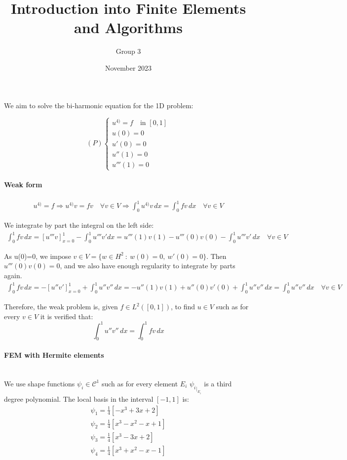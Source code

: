 \documentclass{article}
\title{Introduction into Finite Elements and Algorithms}
\author{Group 3}
\date{November 2023}
\begin{document}
\maketitle

\noindent We aim to solve the bi-harmonic equation for the 1D problem:

\[ (P) \left\{
\begin{array}{rcl}
u^{4)}=f \quad \text{in } [0,1]\\
u(0)=0\\
u'(0)=0\\
u''(1)=0\\
u'''(1)=0
\end{array}
\right.\]

\paragraph{Weak form}
\begin{gather*}
    u^{4)}=f \Rightarrow u^{4)}v=fv \quad\forall v\in V \Rightarrow \int_0^1 u^{4)}v \,dx= \int_0^1 fv \,dx \quad\forall v\in V
\end{gather*}

\noindent We integrate by part the integral on the left side:
\begin{gather*}
    \int_0^1 fv \, dx=[u'''v]_{x=0}^1 -\int_0^1 u'''v'dx=u'''(1)v(1)-u'''(0)v(0) -\int_0^1 u'''v' \, dx \quad\forall v\in V
\end{gather*}

\noindent As u(0)=0, we impose $v\in V=\{w\in H^{2} \: : \: w(0)=0, \: w'(0)=0\}$. Then $u'''(0)v(0)=0$, and we also have enough regularity to integrate by parts again.
\begin{gather*}
    \int_0^1 fv \, dx = -[u''v']_{x=0}^1 + \int_0^1 u''v'' \, dx = -u''(1)v(1)+u''(0)v'(0) + \int_0^1 u''v'' \, dx=\int_0^1 u''v'' \, dx \quad \forall v\in V
\end{gather*}

\noindent Therefore, the weak problem is, given $f\in L^2([0,1])$, to find $u\in V$ such as for every $v\in V$ it is verified that:
\begin{equation}
    \int_0^1 u''v'' \, dx = \int_0^1 fv \, dx
\end{equation}

\paragraph{FEM with Hermite elements}\textbf{ }\\
\noindent We use shape functions $\psi_i \in \mathcal{C}^1$ such as for every element $E_i$ ${\psi_i}_{|_{E_i}}$ is a third degree polynomial. The local basis in the interval $[-1,1]$ is:
\begin{gather*}
         \psi_1= \frac{1}{4}[-x^3+3x+2]\\
         \psi_2= \frac{1}{4}[x^3-x^2-x+1]\\
         \psi_3= \frac{1}{4}[x^3-3x+2]\\
         \psi_4= \frac{1}{4}[x^3+x^2-x-1]\\
\end{gather*}
\end{document}
